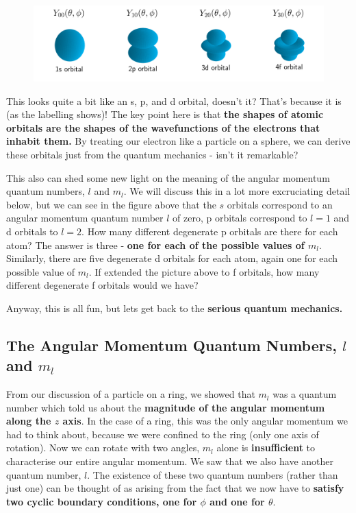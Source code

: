 \documentclass{memoir}[11pt,oneside,a4paper,openany]
\begin{document}
\begin{figure}
	\centering
	\includegraphics[width=\textwidth]{./spherical_harmonics/spherical_harmonics}
\end{figure}

This looks quite a bit like an s, p, and d orbital, doesn't it? That's because it is (as the labelling shows)! The key point here is that \textbf{the shapes of atomic orbitals are the shapes of the wavefunctions of the electrons that inhabit them.} By treating our electron like a particle on a sphere, we can derive these orbitals just from the quantum mechanics - isn't it remarkable?

This also can shed some new light on the meaning of the angular momentum quantum numbers, $l$ and $m_l$. We will discuss this in a lot more excruciating detail below, but we can see in the figure above that the $s$ orbitals correspond to an angular momentum quantum number $l$ of zero, p orbitals correspond to $l=1$ and d orbitals to $l=2$. How many different degenerate p orbitals are there for each atom? The answer is three - \textbf{one for each of the possible values of $m_l$}. Similarly, there are five degenerate d orbitals for each atom, again one for each possible value of $m_l$. If extended the picture above to f orbitals, how many different degenerate f orbitals would we have?

Anyway, this is all fun, but lets get back to the \textbf{serious quantum mechanics.}

\subsection{The Angular Momentum Quantum Numbers, $l$ and $m_l$}
From our discussion of a particle on a ring, we showed that $m_l$ was a quantum number which told us about the \textbf{magnitude of the angular momentum along the $z$ axis}. In the case of a ring, this was the only angular momentum we had to think about, because we were confined to the ring (only one axis of rotation). Now we can rotate with two angles, $m_l$ alone is \textbf{insufficient} to characterise our entire angular momentum. We saw that we also have another quantum number, $l$. The existence of these two quantum numbers (rather than just one) can be thought of as arising from the fact that we now have to \textbf{satisfy two cyclic boundary conditions, one for $\phi$ and one for $\theta$}.
\end{document}
